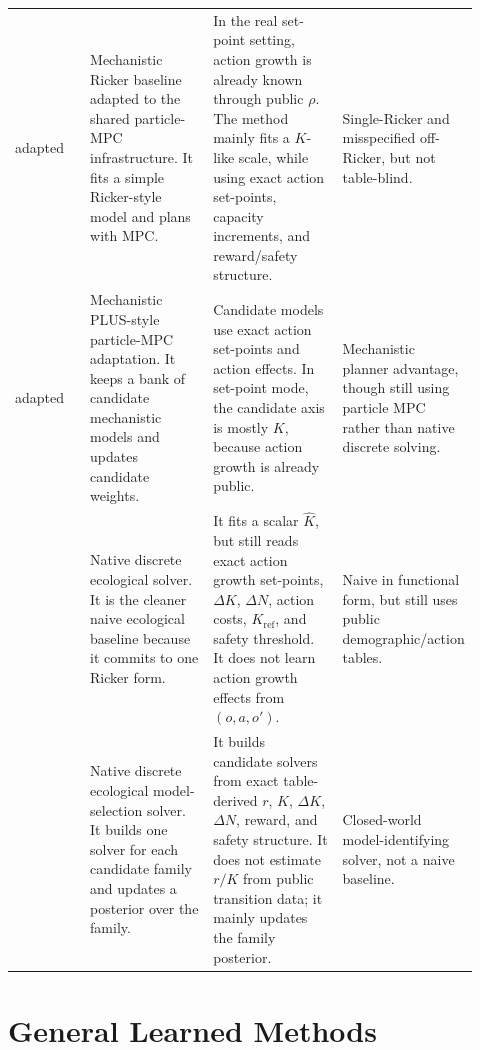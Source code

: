 \documentclass[11pt]{article}
\newcommand{\code}[1]{\texttt{\detokenize{#1}}}
\newcommand{\rhoctl}{\rho}
\newcommand{\Kref}{K_{\mathrm{ref}}}
\begin{document}
\begin{longtable}{p{0.17\linewidth}p{0.29\linewidth}p{0.30\linewidth}p{0.16\linewidth}}
adapted \code{moor} &
Mechanistic Ricker baseline adapted to the shared particle-MPC infrastructure. It fits a simple Ricker-style model and plans with MPC. &
In the real set-point setting, action growth is already known through public \(\rhoctl\). The method mainly fits a \(K\)-like scale, while using exact action set-points, capacity increments, and reward/safety structure. &
Single-Ricker and misspecified off-Ricker, but not table-blind. \\

adapted \code{plus} &
Mechanistic PLUS-style particle-MPC adaptation. It keeps a bank of candidate mechanistic models and updates candidate weights. &
Candidate models use exact action set-points and action effects. In set-point mode, the candidate axis is mostly \(K\), because action growth is already public. &
Mechanistic planner advantage, though still using particle MPC rather than native discrete solving. \\

\code{moor_native} &
Native discrete ecological solver. It is the cleaner naive ecological baseline because it commits to one Ricker form. &
It fits a scalar \(\hat K\), but still reads exact action growth set-points, \(\Delta K\), \(\Delta N\), action costs, \(\Kref\), and safety threshold. It does not learn action growth effects from \((o,a,o')\). &
Naive in functional form, but still uses public demographic/action tables. \\

\code{plus_native} &
Native discrete ecological model-selection solver. It builds one solver for each candidate family and updates a posterior over the family. &
It builds candidate solvers from exact table-derived \(r\), \(K\), \(\Delta K\), \(\Delta N\), reward, and safety structure. It does not estimate \(r/K\) from public transition data; it mainly updates the family posterior. &
Closed-world model-identifying solver, not a naive baseline. \\
\bottomrule
\end{longtable}

\section{General Learned Methods}

\subsection{\code{refplan}}
\end{document}
